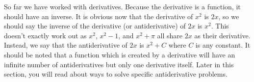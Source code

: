 \documentclass[../revisedmain.tex]{subfiles}
\begin{document}
So far we have worked with derivatives. Because the derivative is a function, it should have an inverse. It is obvious now that the derivative of $x^2$ is $2x$, so we should say the inverse of the derivative (or antiderivative) of $2x$ is $x^2$. This doesn't exactly work out as $x^2$, $x^2-1$, and $x^2+\pi$ all share $2x$ as their derivative. Instead, we say that the antiderivative of $2x$ is $x^2+C$ where $C$ is any constant. It should be noted that a function which is created by a derivative will have an infinite number of antiderivatives but only one derivative itself. Later in this section, you will read about ways to solve specific antiderivative problems.
\end{document}
